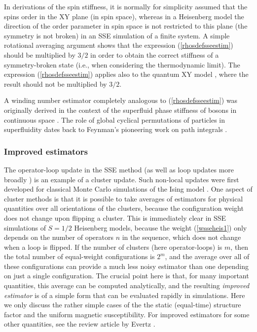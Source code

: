 \documentclass[draft,numberedheadings]{aipproc}
\begin{document}
In derivations of the spin stiffness, it is normally for simplicity assumed that the spins order in the XY plane (in spin space), whereas in a Heisenberg 
model the direction of the order parameter in spin space is not restricted to this plane (the symmetry is not broken) in an SSE simulation of a finite 
system. A simple rotational averaging argument shows that the expression (\ref{rhosdefsseestim}) should be multiplied by $3/2$ in order to obtain the 
correct stiffness of a symmetry-broken state (i.e., when considering the thermodynamic limit). The expression (\ref{rhosdefsseestim}) applies also to the 
quantum XY model \cite{harada97}, where the result should not be multiplied by $3/2$.

A winding number estimator completely analogous to (\ref{rhosdefsseestim}) was originally derived in the context of the superfluid phase stiffness of bosons 
in continuous space \cite{pollock87}. The role of global cyclical permutations of particles in superfluidity dates back to Feynman's pioneering work on path 
integrals \cite{feynman53}.

\subsubsection{Improved estimators}
\label{improvedestimators}

The operator-loop update in the SSE method (as well as loop updates more broadly \cite{evertz1,evertz93}) is an example of a cluster update. Such
non-local updates were first developed for classical Monte Carlo simulations of the Ising model \cite{swendsenwang}. One aspect of cluster methods is that 
it is possible to take averages of estimators for physical quantities over all orientations of the clusters, because the configuration weight does not change 
upon flipping a cluster. This is immediately clear in SSE simulations of $S=1/2$ Heisenberg models, because the weight (\ref{wsseheis1}) only depends on the 
number of operators $n$ in the sequence, which does not change when a loop is flipped. If the number of clusters (here operator-loops) is $m$, then the total 
number of equal-weight configurations is $2^m$, and the average over all of these configurations can provide a much less noisy estimator than one depending on 
just a single configuration. The crucial point here is that, for many important quantities, this average can be computed analytically, and the resulting 
{\it improved estimator} is of a simple form that can be evaluated rapidly in simulations. Here we only discuss the rather simple cases of the the static 
(equal-time) structure factor and the uniform magnetic susceptibility. For improved estimators for some other quantities, see the review article by 
Evertz \cite{evertz1}.
\end{document}
